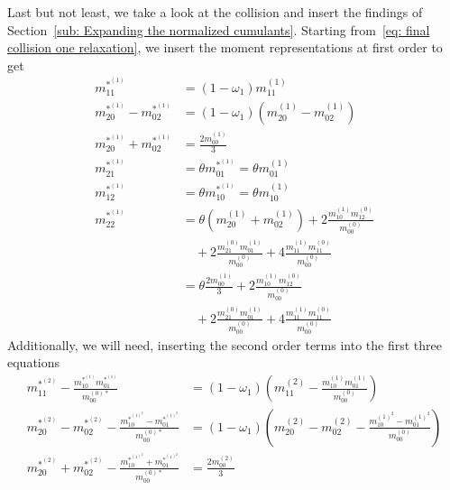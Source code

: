 Last but not least, we take a look at the collision and insert the findings of Section~\ref{sub: Expanding the normalized cumulants}.
Starting from~\eqref{eq: final collision one relaxation}, we insert the moment representations at first order to get
\begin{equation}
  \begin{aligned}
    m_{11}^{*^{(1)}} & = (1-\omega_1) m_{11}^{(1)} \\
    m_{20}^{*^{(1)}} - m_{02}^{*^{(1)}}
      & = (1-\omega_1) (m_{20}^{(1)} - m_{02}^{(1)}) \\
    m_{20}^{*^{(1)}} + m_{02}^{*^{(1)}}
      & =  \frac{2 m_{00}^{(1)}}{3} \\
    m_{21}^{*^{(1)}} & = \theta m_{01}^{*^{(1)}} = \theta m_{01}^{(1)} \\
    m_{12}^{*^{(1)}} & = \theta m_{10}^{*^{(1)}} = \theta m_{10}^{(1)} \\
    m_{22}^{*^{(1)}} & =  \theta (m_{20}^{(1)} + m_{02}^{(1)})
      + 2\frac{ m_{10}^{(1)} m_{12}^{(0)} }{m_{00}^{(0)}}
      \\&\quad
      + 2\frac{ m_{21}^{(0)} m_{01}^{(1)} }{m_{00}^{(0)}}
      + 4\frac{ m_{11}^{(1)} m_{11}^{(0)} }{m_{00}^{(0)}}
      \\&= \theta \frac{2 m_{00}^{(1)}}{3} + 2\frac{ m_{10}^{(1)} m_{12}^{(0)} }{m_{00}^{(0)}}
      \\&\quad
      + 2\frac{ m_{21}^{(0)} m_{01}^{(1)} }{m_{00}^{(0)}}
      + 4\frac{ m_{11}^{(1)} m_{11}^{(0)} }{m_{00}^{(0)}}
  \end{aligned}
\end{equation}
Additionally, we will need, inserting the second order terms into the first three equations
\begin{align}
  m_{11}^{*^{(2)}} - \frac{ m_{10}^{*^{(1)}}m_{01}^{*^{(1)}}}{m_{00}^{(0)*}} & = (1-\omega_1)\left(m_{11}^{(2)} - \frac{ m_{10}^{(1)}m_{01}^{(1)}}{m_{00}^{(0)}}\right) \\
  m_{20}^{*^{(2)}}-m_{02}^{*^{(2)}} - \frac{ m_{10}^{*^{{(1)}^2}} - m_{01}^{*^{{(1)}^2}}}{m_{00}^{(0)*}} & = (1-\omega_1) \left(m_{20}^{(2)}-m_{02}^{(2)} - \frac{ m_{10}^{{(1)}^2} - m_{01}^{{(1)}^2}}{m_{00}^{(0)}}\right) \\
  m_{20}^{*^{(2)}}+m_{02}^{*^{(2)}} - \frac{ m_{10}^{*^{{(1)}^2}} + m_{01}^{*^{{(1)}^2}}}{m_{00}^{(0)*}} & = \frac{2 m_{00}^{(2)}}{3}
\end{align}
